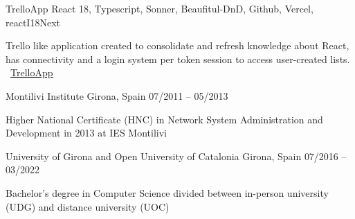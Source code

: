 \documentclass[]{awesome-cv}
\begin{document}
\begin{cventries}
    \cventry
	{}
	{TrelloApp \vspace{-5mm}}
	{React 18, Typescript, Sonner, Beaufitul-DnD, Github, Vercel, reactI18Next \vspace{-5mm}}
	{}
	{\begin{cvsectionnormaltext}
		\item{Trello like application created to consolidate and refresh knowledge about React, has connectivity and a login system per token session to access user-created lists.
		\newline \faLink\ \href{https://trello-app-giacconidev.vercel.app/user/login}{TrelloApp}}
	\end{cvsectionnormaltext}}
 
	\vspace{-5mm}
\end{cventries}

\vspace{8mm}
\begin{cventries}
	\vspace{2mm}
	\cventry
	{}
	{Montilivi Institute \vspace{-5mm}}
	{Girona, Spain \vspace{-5mm}}
	{07/2011 – 05/2013 \vspace{-5mm}}
	{\begin{cvsectionnormaltext} 
		\item{Higher National Certificate (HNC) in Network System Administration and Development in 2013 at IES Montilivi}
	\end{cvsectionnormaltext}}

 \cventry
	{}
	{University of Girona and Open University of Catalonia \vspace{-5mm}}
	{Girona, Spain \vspace{-5mm}}
	{07/2016 – 03/2022 \vspace{-5mm}}
	{\begin{cvsectionnormaltext} 
		\item{Bachelor's degree in Computer Science divided between in-person university (UDG) and distance university (UOC)}
	\end{cvsectionnormaltext}}
\end{cventries}
\end{document}

